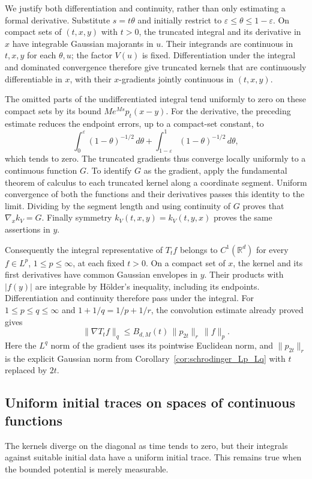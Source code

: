 We justify both differentiation and continuity, rather than only
estimating a formal derivative. Substitute $s=t\theta$ and initially
restrict to $\varepsilon\leq\theta\leq1-\varepsilon$.
On compact sets of $(t,x,y)$ with $t>0$, the truncated integral and
its derivative in $x$ have integrable Gaussian majorants in $u$.
Their integrands are continuous in $t,x,y$ for each $\theta,u$;
the factor $V(u)$ is fixed. Differentiation under the integral and
dominated convergence therefore give truncated kernels that are
continuously differentiable in $x$, with their $x$-gradients jointly
continuous in $(t,x,y)$.

The omitted parts of the undifferentiated integral tend uniformly
to zero on these compact sets by its bound $M e^{Ms}p_t(x-y)$.
For the derivative, the preceding estimate reduces the endpoint
errors, up to a compact-set constant, to
\[
\int_0^\varepsilon(1-\theta)^{-1/2}\,d\theta
 +\int_{1-\varepsilon}^1(1-\theta)^{-1/2}\,d\theta,
\]
which tends to zero. The truncated gradients thus converge locally
uniformly to a continuous function $G$. To identify $G$ as the
gradient, apply the fundamental theorem of calculus to each truncated
kernel along a coordinate segment. Uniform convergence of both the
functions and their derivatives passes this identity to the limit.
Dividing by the segment length and using continuity of $G$ proves
that $\nabla_x k_V=G$. Finally symmetry
$k_V(t,x,y)=k_V(t,y,x)$ proves the same assertions in $y$.
\Done

Consequently the integral representative of $T_tf$ belongs to
$C^1(\mathbb R^d)$ for every $f\in L^p$, $1\leq p\leq\infty$,
at each fixed $t>0$. On a compact set of $x$, the kernel and its first
derivatives have common Gaussian envelopes in $y$. Their products
with $|f(y)|$ are integrable by H\"older's inequality, including its
endpoints. Differentiation and continuity therefore pass under the
integral. For $1\leq p\leq q\leq\infty$ and
$1+1/q=1/p+1/r$, the convolution estimate already proved gives
\[
\|\nabla T_tf\|_q
\leq B_{d,M}(t)\,\|p_{2t}\|_r\,\|f\|_p.
\]
Here the $L^q$ norm of the gradient uses its pointwise Euclidean norm,
and $\|p_{2t}\|_r$ is the explicit Gaussian norm from
Corollary~\ref{cor:schrodinger_Lp_Lq} with $t$ replaced by $2t$.

\subsection{Uniform initial traces on spaces of continuous functions}
The kernels diverge on the diagonal as time tends to zero, but their
integrals against suitable initial data have a uniform initial trace.
This remains true when the bounded potential is merely measurable.

